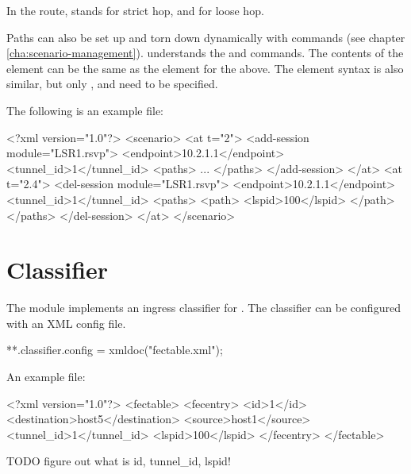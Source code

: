 In the route,  stands for strict hop, and  for loose hop.

Paths can also be set up and torn down dynamically with  
commands (see chapter \ref{cha:scenario-management}). 
 understands the  and 
 commands. The contents of the 
element can be the same as the  element for the 
above. The  element syntax is also similar, but only
,  and  need to be specified.

The following is an example  file:

\begin{XML}
<?xml version="1.0"?>
<scenario>
    <at t="2">
        <add-session module="LSR1.rsvp">
            <endpoint>10.2.1.1</endpoint>
            <tunnel_id>1</tunnel_id>
            <paths>
                ...
            </paths>
        </add-session>
    </at>
    <at t="2.4">
        <del-session module="LSR1.rsvp">
            <endpoint>10.2.1.1</endpoint>
            <tunnel_id>1</tunnel_id>
            <paths>
                <path>
                    <lspid>100</lspid>
                </path>
            </paths>
        </del-session>
    </at>
</scenario>
\end{XML}

\section{Classifier}

The  module implements an ingress classifier for
. The classifier can be configured with an XML config file.

\begin{inifile}
**.classifier.config = xmldoc("fectable.xml");
\end{inifile}

An example  file:

\begin{XML}
<?xml version="1.0"?>
<fectable>
    <fecentry>
        <id>1</id>
        <destination>host5</destination>
        <source>host1</source>
        <tunnel_id>1</tunnel_id>
        <lspid>100</lspid>
    </fecentry>
</fectable>
\end{XML}

TODO figure out what is id, tunnel\_id, lspid!

